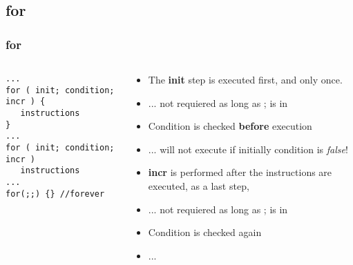 \documentclass[10pt]{beamer}
\begin{document}
\subsection{for}

\begin{frame}[fragile]
  \frametitle{for}
  \begin{columns}
    \begin{column}{0.6\textwidth}
\begin{lstlisting}
...
for ( init; condition; incr ) {
   instructions
}
...
for ( init; condition; incr )
   instructions
...
for(;;) {} //forever
\end{lstlisting}
    \end{column}
    \begin{column}{0.5\textwidth}
    \begin{itemize}
      \item The \textbf{init} step is executed first, and only once.
      \item ... not requiered as long as ; is in
      \item Condition is checked \textbf{before} execution
      \item ... will not execute if initially condition is  \textit{false}!
      \item \textbf{incr} is performed after the instructions are executed, as a last step,
      \item ... not requiered as long as ; is in
      \item Condition is checked again
      \item ...
    \end{itemize}
    \end{column}
  \end{columns}
\end{frame}
\end{document}
